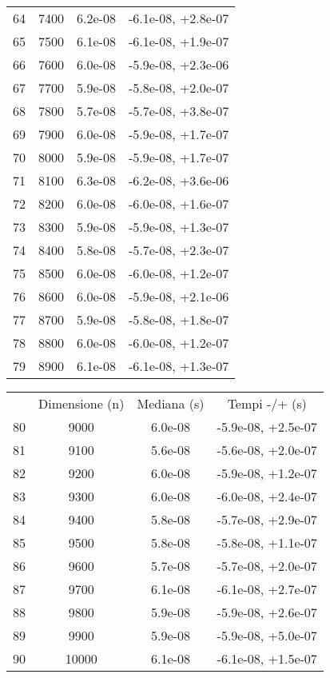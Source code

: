\begin{table}
\begin{adjustbox}{width=1\textwidth/2}
\begin{tabular}{|c|c|c|c|}
\cline{1-4}
64 & 7400 & 6.2e-08 & -6.1e-08, +2.8e-07 \\
\cline{1-4}
65 & 7500 & 6.1e-08 & -6.1e-08, +1.9e-07 \\
\cline{1-4}
66 & 7600 & 6.0e-08 & -5.9e-08, +2.3e-06 \\
\cline{1-4}
67 & 7700 & 5.9e-08 & -5.8e-08, +2.0e-07 \\
\cline{1-4}
68 & 7800 & 5.7e-08 & -5.7e-08, +3.8e-07 \\
\cline{1-4}
69 & 7900 & 6.0e-08 & -5.9e-08, +1.7e-07 \\
\cline{1-4}
70 & 8000 & 5.9e-08 & -5.9e-08, +1.7e-07 \\
\cline{1-4}
71 & 8100 & 6.3e-08 & -6.2e-08, +3.6e-06 \\
\cline{1-4}
72 & 8200 & 6.0e-08 & -6.0e-08, +1.6e-07 \\
\cline{1-4}
73 & 8300 & 5.9e-08 & -5.9e-08, +1.3e-07 \\
\cline{1-4}
74 & 8400 & 5.8e-08 & -5.7e-08, +2.3e-07 \\
\cline{1-4}
75 & 8500 & 6.0e-08 & -6.0e-08, +1.2e-07 \\
\cline{1-4}
76 & 8600 & 6.0e-08 & -5.9e-08, +2.1e-06 \\
\cline{1-4}
77 & 8700 & 5.9e-08 & -5.8e-08, +1.8e-07 \\
\cline{1-4}
78 & 8800 & 6.0e-08 & -6.0e-08, +1.2e-07 \\
\cline{1-4}
79 & 8900 & 6.1e-08 & -6.1e-08, +1.3e-07 \\
\cline{1-4}
\end{tabular}
\end{adjustbox}
\end{table}

\begin{table}
\centering
\begin{adjustbox}{width=1\textwidth/2}
\begin{tabular}{|c|c|c|c|}
\hline
 & Dimensione (n) & Mediana (s) & Tempi -/+ (s) \\
80 & 9000 & 6.0e-08 & -5.9e-08, +2.5e-07 \\
\cline{1-4}
81 & 9100 & 5.6e-08 & -5.6e-08, +2.0e-07 \\
\cline{1-4}
82 & 9200 & 6.0e-08 & -5.9e-08, +1.2e-07 \\
\cline{1-4}
83 & 9300 & 6.0e-08 & -6.0e-08, +2.4e-07 \\
\cline{1-4}
84 & 9400 & 5.8e-08 & -5.7e-08, +2.9e-07 \\
\cline{1-4}
85 & 9500 & 5.8e-08 & -5.8e-08, +1.1e-07 \\
\cline{1-4}
86 & 9600 & 5.7e-08 & -5.7e-08, +2.0e-07 \\
\cline{1-4}
87 & 9700 & 6.1e-08 & -6.1e-08, +2.7e-07 \\
\cline{1-4}
88 & 9800 & 5.9e-08 & -5.9e-08, +2.6e-07 \\
\cline{1-4}
89 & 9900 & 5.9e-08 & -5.9e-08, +5.0e-07 \\
\cline{1-4}
90 & 10000 & 6.1e-08 & -6.1e-08, +1.5e-07 \\
\cline{1-4}
\end{tabular}
\end{adjustbox}
\end{table}
